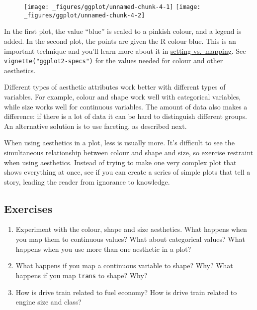 \begin{figure}[H]
  \texttt{[image: \_figures/ggplot/unnamed-chunk-4-1]}%
  \texttt{[image: \_figures/ggplot/unnamed-chunk-4-2]}
\end{figure}

In the first plot, the value ``blue'' is scaled to a pinkish colour, and
a legend is added. In the second plot, the points are given the R colour
blue. This is an important technique and you'll learn more about it in
\hyperref[sub:setting-mapping]{setting vs.~mapping}. See
\texttt{vignette("ggplot2-specs")} for the values needed for colour and
other aesthetics.

Different types of aesthetic attributes work better with different types
of variables. For example, colour and shape work well with categorical
variables, while size works well for continuous variables. The amount of
data also makes a difference: if there is a lot of data it can be hard
to distinguish different groups. An alternative solution is to use
faceting, as described next.

When using aesthetics in a plot, less is usually more. It's difficult to
see the simultaneous relationship between colour and shape and size, so
exercise restraint when using aesthetics. Instead of trying to make one
very complex plot that shows everything at once, see if you can create a
series of simple plots that tell a story, leading the reader from
ignorance to knowledge.

\subsection{Exercises}

\begin{enumerate}
\def\labelenumi{\arabic{enumi}.}
\item
  Experiment with the colour, shape and size aesthetics. What happens
  when you map them to continuous values? What about categorical values?
  What happens when you use more than one aesthetic in a plot?
\item
  What happens if you map a continuous variable to shape? Why? What
  happens if you map \texttt{trans} to shape? Why?
\item
  How is drive train related to fuel economy? How is drive train related
  to engine size and class?
\end{enumerate}



